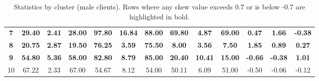 \documentclass[10pt]{article}
\begin{document}
\begin{table}[h]
{\begin{tabular}{ccccccccccccc}
        \textbf{7}  & \textbf{29.40} & \textbf{2.41}  & \textbf{28.00} & \textbf{97.80} & \textbf{16.84} & \textbf{88.00} & \textbf{69.80} & \textbf{4.87}  & \textbf{69.00} & \textbf{0.47}       & \textbf{1.66}  & \textbf{-0.38} \\
        \textbf{8}  & \textbf{20.75} & \textbf{2.87}  & \textbf{19.50} & \textbf{76.25} & \textbf{3.59}  & \textbf{75.50} & \textbf{8.00}  & \textbf{3.56}  & \textbf{7.50}  & \textbf{1.85} & \textbf{0.89}  & \textbf{0.27} \\
        \textbf{9}  & \textbf{54.80} & \textbf{5.36}  & \textbf{58.00} & \textbf{82.80} & \textbf{8.79}  & \textbf{85.00} & \textbf{20.40} & \textbf{10.41} & \textbf{15.00} & \textbf{-0.66}      & \textbf{-0.38}        & \textbf{1.01} \\
        10          & 67.22        & 2.33         & 67.00         & 54.67        & 8.12          & 54.00         & 50.11        & 6.09          & 51.00         & -0.50        & -0.06        & -0.12 \\
        \bottomrule
        \end{tabular}%
    }
    \caption{Statistics by cluster (male clients). Rows where any skew value exceeds 0.7 or is below -0.7 are highlighted in bold.}
    \label{tab:estadisticas_clusters_hombres_table}
\end{table}
\end{document}
